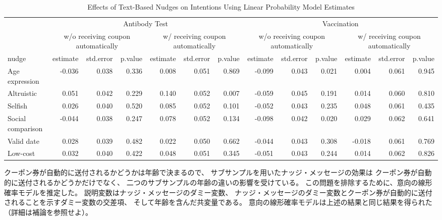 \documentclass[
  11pt,
  a4paper,
]{article}
\begin{document}
\begin{table}

\caption{\label{tab:int-reg-ftest}Effects of Text-Based Nudges on Intentions Using Linear Probability Model Estimates}
\centering
\begin{tabular}[t]{lrrrrrrrrrrrr}
\toprule
\multicolumn{1}{c}{ } & \multicolumn{6}{c}{Antibody Test} & \multicolumn{6}{c}{Vaccination} \\
\cmidrule(l{3pt}r{3pt}){2-7} \cmidrule(l{3pt}r{3pt}){8-13}
\multicolumn{1}{c}{ } & \multicolumn{3}{c}{w/o receiving coupon automatically} & \multicolumn{3}{c}{w/ receiving coupon automatically} & \multicolumn{3}{c}{w/o receiving coupon automatically} & \multicolumn{3}{c}{w/ receiving coupon automatically} \\
\cmidrule(l{3pt}r{3pt}){2-4} \cmidrule(l{3pt}r{3pt}){5-7} \cmidrule(l{3pt}r{3pt}){8-10} \cmidrule(l{3pt}r{3pt}){11-13}
nudge & estimate & std.error & p.value & estimate  & std.error  & p.value  & estimate   & std.error   & p.value   & estimate    & std.error    & p.value   \\
\midrule
Age expression & -0.036 & 0.038 & 0.336 & 0.008 & 0.051 & 0.869 & -0.099 & 0.043 & 0.021 & 0.004 & 0.061 & 0.945\\
Altruistic & 0.051 & 0.042 & 0.229 & 0.140 & 0.052 & 0.007 & -0.059 & 0.045 & 0.191 & 0.014 & 0.060 & 0.810\\
Selfish & 0.026 & 0.040 & 0.520 & 0.085 & 0.052 & 0.101 & -0.052 & 0.043 & 0.235 & 0.048 & 0.061 & 0.435\\
Social comparison & -0.044 & 0.038 & 0.247 & 0.078 & 0.052 & 0.134 & -0.098 & 0.042 & 0.020 & 0.029 & 0.062 & 0.641\\
Valid date & 0.028 & 0.039 & 0.482 & 0.022 & 0.050 & 0.662 & -0.044 & 0.043 & 0.308 & -0.018 & 0.061 & 0.769\\
Low-cost & 0.032 & 0.040 & 0.422 & 0.048 & 0.051 & 0.345 & -0.051 & 0.043 & 0.244 & 0.014 & 0.062 & 0.826\\
\bottomrule
\end{tabular}
\end{table}

クーポン券が自動的に送付されるかどうかは年齢で決まるので、
サブサンプルを用いたナッジ・メッセージの効果は
クーポン券が自動的に送付されるかどうかだけでなく、
二つのサブサンプルの年齢の違いの影響を受けている。
この問題を排除するために、意向の線形確率モデルを推定した。
説明変数はナッジ・メッセージのダミー変数、
ナッジ・メッセージのダミー変数とクーポン券が自動的に送付されることを示すダミー変数の交差項、
そして年齢を含んだ共変量である。
意向の線形確率モデルは上述の結果と同じ結果を得られた（詳細は補論を参照せよ）。
\end{document}
